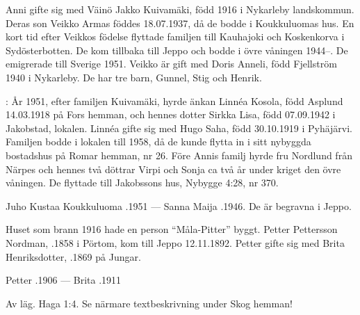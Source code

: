 Anni gifte sig med Väinö Jakko Kuivamäki, född 1916 i Nykarleby landskommun. Deras son Veikko Armas föddes 18.07.1937, då de bodde i Koukkuluomas hus. En kort tid efter Veikkos födelse flyttade familjen till Kauhajoki och Koskenkorva i Sydösterbotten. De kom tillbaka till Jeppo och bodde i övre våningen 1944--. De emigrerade till Sverige 1951. Veikko är gift med Doris Anneli, född Fjellström 1940 i Nykarleby. De har tre barn, Gunnel, Stig och Henrik.

:
År 1951, efter familjen Kuivamäki, hyrde änkan Linnéa Kosola, född Asplund 14.03.1918 på Fors hemman, och hennes dotter Sirkka Lisa, född 07.09.1942 i Jakobstad, lokalen. Linnéa gifte sig med	Hugo Saha, född 30.10.1919 i Pyhäjärvi. Familjen bodde i lokalen till 1958, då de kunde flytta in i sitt nybyggda bostadshus på Romar hemman, nr 26. Före Annis familj hyrde fru Nordlund från Närpes och hennes två döttrar Virpi och Sonja ca två år under kriget den övre våningen. De flyttade till Jakobssons hus, Nybygge 4:28, nr 370.

Juho Kustaa Koukkuluoma .1951  ---  Sanna Maija .1946. De är begravna i Jeppo.

Huset som brann 1916 hade en person ``Måla-Pitter'' byggt. Petter Pettersson Nordman, .1858 i Pörtom, kom till Jeppo 12.11.1892. Petter gifte sig med Brita Henriksdotter, .1869 på Jungar.

Petter .1906  ---  Brita .1911



%

Av läg. Haga 1:4.
Se närmare textbeskrivning under Skog hemman!\jhvspace{}
